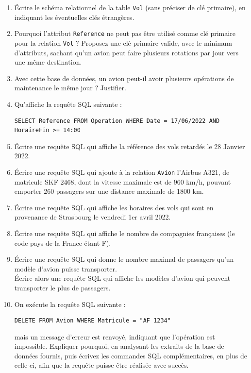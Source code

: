 \documentclass[11pt,a4paper,french,twoside]{PMCours}
\begin{document}
\begin{enumerate}
\item Écrire le schéma relationnel de la table \verb'Vol' (sans préciser de clé primaire), en indiquant les éventuelles clés étrangères.
\item Pourquoi l'attribut \verb'Reference' ne peut pas être utilisé comme clé primaire pour la relation \verb'Vol' ? Proposez une clé primaire valide, avec le minimum d'attributs, sachant qu'un avion peut faire plusieurs rotations par jour vers une même destination.
\item Avec cette base de données, un avion peut-il avoir plusieurs opérations de maintenance le même jour ? Justifier.
\item Qu'affiche la requête SQL suivante :
\begin{verbatim}
SELECT Reference FROM Operation WHERE Date = 17/06/2022 AND HoraireFin >= 14:00
\end{verbatim} 
\item Écrire une requête SQL qui affiche la référence des vols retardés le 28 Janvier 2022.
\item Écrire une requête SQL qui ajoute à la relation \verb'Avion' l'Airbus A321, de matricule SKF 2468, dont la vitesse maximale est de 960 km/h, pouvant emporter 260 passagers sur une distance maximale de 1800 km.
\item Écrire une requête SQL qui affiche les horaires des vols qui sont en provenance de Strasbourg le vendredi 1er avril 2022.
\item Écrire une requête SQL qui affiche le nombre de compagnies françaises (le code pays de la France étant F).
\item Écrire une requête SQL qui donne le nombre maximal de passagers qu'un modèle d'avion puisse transporter.\\
Écrire alors une requête SQL qui affiche les modèles d'avion qui peuvent transporter le plus de passagers.
\item On exécute la requête SQL suivante :
\begin{verbatim}
DELETE FROM Avion WHERE Matricule = "AF 1234"
\end{verbatim} 
mais un message d'erreur est renvoyé, indiquant que l'opération est impossible. Expliquer pourquoi, en analysant les extraits de la base de données fournis, puis écrivez les commandes SQL complémentaires, en plus de celle-ci, afin que la requête puisse être réalisée avec succès.

\end{enumerate}
\end{document}
